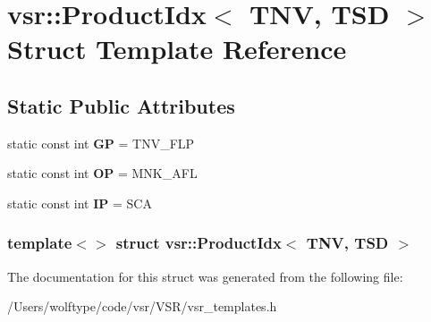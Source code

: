 \hypertarget{structvsr_1_1_product_idx_3_01_t_n_v_00_01_t_s_d_01_4}{\section{vsr\-:\-:Product\-Idx$<$ T\-N\-V, T\-S\-D $>$ Struct Template Reference}
\label{structvsr_1_1_product_idx_3_01_t_n_v_00_01_t_s_d_01_4}
}
\subsection*{Static Public Attributes}
\begin{DoxyCompactItemize}
\item 
\hypertarget{structvsr_1_1_product_idx_3_01_t_n_v_00_01_t_s_d_01_4_aa5c8cb0d9fb3f199929df5416f5f41c2}{static const int {\bfseries G\-P} = T\-N\-V\-\_\-\-F\-L\-P}\label{structvsr_1_1_product_idx_3_01_t_n_v_00_01_t_s_d_01_4_aa5c8cb0d9fb3f199929df5416f5f41c2}

\item 
\hypertarget{structvsr_1_1_product_idx_3_01_t_n_v_00_01_t_s_d_01_4_aba8a0b0a0f9913600ac181292acd2f4a}{static const int {\bfseries O\-P} = M\-N\-K\-\_\-\-A\-F\-L}\label{structvsr_1_1_product_idx_3_01_t_n_v_00_01_t_s_d_01_4_aba8a0b0a0f9913600ac181292acd2f4a}

\item 
\hypertarget{structvsr_1_1_product_idx_3_01_t_n_v_00_01_t_s_d_01_4_aa26acb898a94b56d9acb6c7b22062551}{static const int {\bfseries I\-P} = S\-C\-A}\label{structvsr_1_1_product_idx_3_01_t_n_v_00_01_t_s_d_01_4_aa26acb898a94b56d9acb6c7b22062551}

\end{DoxyCompactItemize}
\subsubsection*{template$<$$>$ struct vsr\-::\-Product\-Idx$<$ T\-N\-V, T\-S\-D $>$}



The documentation for this struct was generated from the following file\-:\begin{DoxyCompactItemize}
\item 
/\-Users/wolftype/code/vsr/\-V\-S\-R/vsr\-\_\-templates.\-h\end{DoxyCompactItemize}

